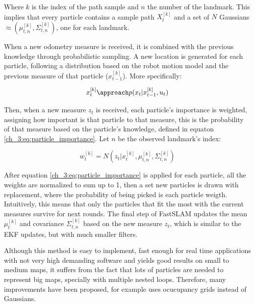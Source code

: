       Where $k$ is the index of the path sample and $n$ the number of the landmark. This implies that every particle contains a sample path $X_{t}^{[k]}$ and a set of $N$ Gaussians $\approx (\mu_{t,n}^{[k]}, \Sigma_{t,n}^{[k]})$, one for each landmark.

      When a new odometry measure is received, it is combined with the previous knowledge through probabilistic sampling. A new location is generated for each particle, following a distribution based on the robot motion model and the previous measure of that particle ($x_{t-1}^{[k]}$). More specifically:

      \begin{equation} \label{ch_3:eq:particle_update}
        x_{t}^{[k]} \approach p(x_{t} | x_{t-1}^{[k]}, u_{t})
      \end{equation}

      Then, when a new measure $z_{t}$ is received, each particle's importance is weighted, assigning how important is that particle to that measure, this is the probability of that measure based on the particle's knowledge, defined in equaton \ref{ch_3:eq:particle_importance}. Let $n$ be the observed landmark's index:

      \begin{equation} \label{ch_3:eq:particle_importance}
        w_{t}^{[k]} = N(z_{t} | x_{t}^{[k]}, \mu_{t,n}^{[k]}, \Sigma_{t,n}^{[k]})
      \end{equation}

      After equation \ref{ch_3:eq:particle_importance} is applied for each particle, all the weights are normalized to sum up to 1, then a set new particles is drawn with replacement, where the probability of being picked is each particle weigth. Intuitively, this means that only the particles that fit the most with the current measures survive for next rounds. The final step of FastSLAM updates the mean $\mu_{t}^{[k]}$ and covariance $\Sigma_{t,n}^{[k]}$ based on the new measure $z_{t}$, which is similar to the EKF updates, but with much smaller filters.

      Although this method is easy to implement, fast enough for real time applications with not very high demanding software and yields good results on small to medium maps, it suffers from the fact that lots of particles are needed to represent big maps, specially with multiple nested loops. Therefore, many improvements have been proposed, \cite{Grisetti2007} for example uses ocucupancy grids instead of Gaussians.

